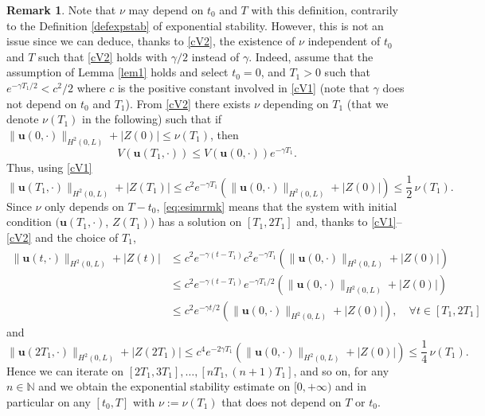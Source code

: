 \documentclass[JEP,XML,SOM,Unicode]{cedram}
\theoremstyle{definition}
\newtheorem{rmk}[thm]{Remark}
\begin{document}
\begin{rmk}
Note that $\nu$ may depend on $t_{0}$ and $T$ with this definition, contrarily to the Definition \ref{defexpstab} of exponential stability. However, this is not an issue since we can deduce, thanks to \eqref{cV2}, the existence of $\nu$ independent of $t_{0}$ and $T$ such that \eqref{cV2} holds with $\gamma/2$ instead of $\gamma$. Indeed, assume that the assumption of Lemma \ref{lem1} holds and select $t_{0}=0$, and $T_{1}>0$ such that $e^{-\gamma T_{1}/2}<c^{2}/2$ where $c$ is the positive constant involved in \eqref{cV1} (note that $\gamma$ does not depend on $t_{0}$ and $T_{1}$). From \eqref{cV2} there exists $\nu$ depending on $T_{1}$ (that we denote $\nu(T_{1})$ in the following) such that if $\lVert \boldsymbol{u}({0},\cdot)\rVert_{H^{2}(0,L)}+|Z({0})|\leq {\nu}(T_{1})$, then
\begin{equation*}
V(\boldsymbol{u}(T_{1},\cdot))\leq V(\boldsymbol{u}(0,\cdot))e^{-\gamma T_{1}}.
\end{equation*}
Thus, using \eqref{cV1}
\begin{equation}
\label{eq:esimrmk}
\lVert \boldsymbol{u}(T_{1},\cdot)\rVert_{H^{2}(0,L)}+|Z(T_{1})|\leq c^{2}e^{-\gamma T_{1}}\left(\lVert \boldsymbol{u}({0},\cdot)\rVert_{H^{2}(0,L)}+|Z({0})|\right)\leq \frac{1}{2}\,\nu (T_{1}).
\end{equation}
Since $\nu$ only depends on $T-t_{0}$, \eqref{eq:esimrmk} means that the system with initial condition $(\boldsymbol{u}(T_{1},\cdot)$, $Z(T_{1}))$ has a solution on $[T_{1},2T_{1}]$ and, thanks to \eqref{cV1}--\eqref{cV2} and the choice of $T_{1}$,
\begin{equation*}
\begin{split}
\lVert \boldsymbol{u}(t,\cdot)\rVert_{H^{2}(0,L)}+|Z(t)|&\leq c^{2}e^{-\gamma(t-T_{1})}c^{2}e^{-\gamma T_{1}}\left(\lVert \boldsymbol{u}({0},\cdot)\rVert_{H^{2}(0,L)}+|Z({0})|\right)\\
&\leq c^{2}e^{-\gamma(t-T_{1})}e^{-\gamma T_{1}/2}\left(\lVert \boldsymbol{u}({0},\cdot)\rVert_{H^{2}(0,L)}+|Z({0})|\right)\\
&\leq c^{2}e^{-\gamma t/2}\left(\lVert \boldsymbol{u}({0},\cdot)\rVert_{H^{2}(0,L)}+|Z({0})|\right),\quad\forall t\in[T_{1},2T_{1}]
\end{split}
\end{equation*}
and
\begin{equation*}
\lVert \boldsymbol{u}(2T_{1},\cdot)\rVert_{H^{2}(0,L)}+|Z(2T_{1})|\leq c^{4}e^{-2\gamma T_{1}}\left(\lVert \boldsymbol{u}({0},\cdot)\rVert_{H^{2}(0,L)}+|Z({0})|\right)\leq \frac{1}{4}\,\nu (T_{1}).
\end{equation*}
Hence we can iterate on $[2T_{1}, 3T_{1}],\dots,[nT_{1},(n+1)T_{1}]$, and so on, for any $n\in\mathbb{N}$ and we obtain the exponential stability estimate on $[0,+\infty)$ and in particular on any $[t_{0},T]$ with $\nu := \nu(T_{1})$ that does not depend on $T$ or $t_{0}$.
\end{rmk}
\end{document}
